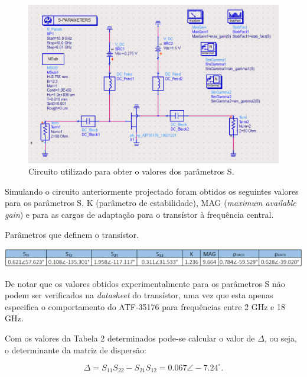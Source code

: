 \documentclass[11pt]{article}
\numberwithin{equation}{section}
\begin{document}
\begin{figure}[H]
	\centering
	\includegraphics[keepaspectratio=true, scale=0.41]{exps/Circuito_1}
	\vspace{-0.5em}
	\caption{Circuito utilizado para obter o valores dos parâmetros S.}
	\label{fig:Circuito_1}
	\vspace{-0.8em}
\end{figure}

Simulando o circuito anteriormente projectado foram obtidos os seguintes valores para os parâmetros S, K (parâmetro de estabilidade), MAG (\textit{maximum available gain}) e para as cargas de adaptação para o transístor à frequência central.

\begin{table}[H]
 	\centering
 	\caption{Parâmetros que definem o transístor.}
 	\vspace{-1.5mm}
 	\includegraphics[keepaspectratio=true, scale=0.45]{teoricas/table2}
 	\label{tab:param_S}
\end{table}

De notar que os valores obtidos experimentalmente para os parâmetros S não podem ser verificados na \textit{datasheet} do transístor, uma vez que esta apenas especifica o comportamento do ATF-35176 para frequências entre 2 GHz e 18 GHz.

Com os valores da Tabela 2 determinados pode-se calcular o valor de $\Delta$, ou seja, o determinante da matriz de dispersão:

\vspace{-3mm}
\begin{equation}
\Delta = S_{11}S_{22} - S_{21}S_{12} = 0.067\angle-7.24 ^{\circ}.
\label{eq:delta}
\end{equation}
\end{document}
